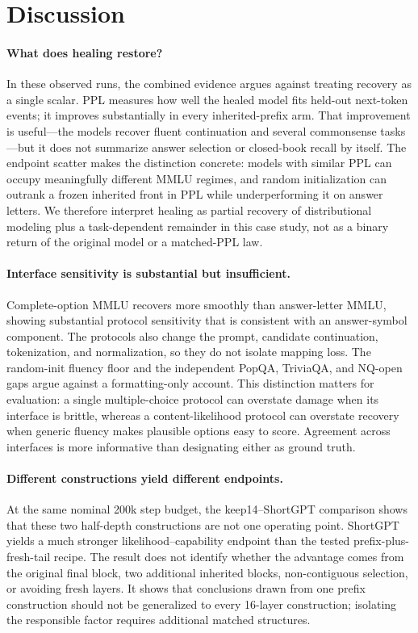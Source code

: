 \section{Discussion}
\label{sec:discussion}

\paragraph{What does healing restore?}
In these observed runs, the combined evidence argues against treating recovery
as a single scalar. PPL
measures how well the healed model fits held-out next-token events; it improves
substantially in every inherited-prefix arm. That improvement is useful---the
models recover fluent continuation and several commonsense tasks---but it does
not summarize answer selection or closed-book recall by itself. The endpoint
scatter makes the distinction concrete: models with similar PPL can occupy
meaningfully different MMLU regimes, and random initialization can outrank a
frozen inherited front in PPL while underperforming it on answer letters. We
therefore interpret healing as partial recovery of distributional modeling plus
a task-dependent remainder in this case study, not as a binary return of the
original model or a matched-PPL law.

\paragraph{Interface sensitivity is substantial but insufficient.}
Complete-option MMLU recovers more smoothly than answer-letter MMLU, showing
substantial protocol sensitivity that is consistent with an answer-symbol
component. The protocols also change the prompt, candidate continuation,
tokenization, and normalization, so they do not isolate mapping loss. The
random-init fluency floor and the independent PopQA, TriviaQA,
and NQ-open gaps argue against a formatting-only account. This distinction matters
for evaluation: a single multiple-choice protocol can overstate damage when its
interface is brittle, whereas a content-likelihood protocol can overstate
recovery when generic fluency makes plausible options easy to score. Agreement
across interfaces is more informative than designating either as ground truth.

\paragraph{Different constructions yield different endpoints.}
At the same nominal 200k step budget, the keep14--ShortGPT comparison shows that
these two half-depth constructions are not one operating point. ShortGPT yields a much stronger
likelihood--capability endpoint than the tested prefix-plus-fresh-tail recipe.
The result does not identify whether the advantage comes from the
original final block, two additional inherited blocks, non-contiguous selection,
or avoiding fresh layers. It shows that conclusions drawn from one prefix
construction should not be generalized to every 16-layer construction;
isolating the responsible factor requires additional matched structures.

